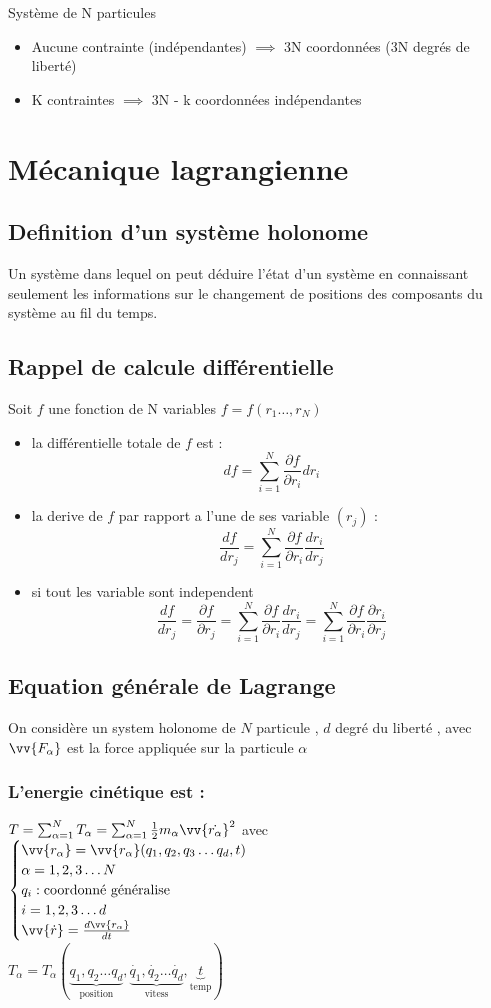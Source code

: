 \documentclass[12pt,oneside]{book}
\begin{document}
Système de N particules
\begin{itemize}
    \item Aucune contrainte (indépendantes) $\implies$ 3N coordonnées (3N degrés de liberté)
    \item K contraintes $\implies$ 3N - k coordonnées indépendantes
\end{itemize}
\chapter{Mécanique lagrangienne}
\section{Definition d'un système holonome }
Un système dans lequel on peut déduire l'état d'un système en connaissant seulement les informations sur le changement de positions des composants du système au fil du temps.
\section{Rappel de calcule différentielle}
Soit $f$ une fonction de N variables $f=f(r_1 \ldots , r_N)$
\begin{itemize}
	\item la différentielle totale de $f$ est :
		\[df = \sum^N_{i=1}\frac{\partial f}{\partial r_i}dr_i\]
	\item la derive de $f$ par rapport a l'une de ses variable $(r_j)$ :
	      \[ \frac{df}{dr_j} = \sum^N_{i=1}\frac{\partial f}{\partial r_i}\frac{dr_i}{dr_j} \]
	\item si tout les variable sont independent
	      \[ \frac{df}{dr_j} = \frac{\partial f}{\partial r_j} = \sum^N_{i=1}\frac{\partial f}{\partial r_i}\frac{dr_i}{dr_j} = \sum^N_{i=1}\frac{\partial f}{\partial r_i}\frac{\partial r_i}{\partial r_j} \]
\end{itemize}
\pagebreak
\section{Equation générale de Lagrange }
On considère un system holonome de $N$ particule , $d$ degré du liberté , avec $\vv{F_\alpha}$ est la force appliquée sur la particule $\alpha$
\subsection{L'energie cinétique est :}
$T = \sum^N_{\alpha=1}T_\alpha =\sum^N_{\alpha=1}\frac{1}{2}m_\alpha\vv{\dot{r_\alpha}}^2 $ avec $\begin{cases}
	\vv{r_\alpha} = \vv{r_\alpha}(q_1,q_2,q_3\ldots q_d ,t)\\
	\alpha = 1,2,3 \ldots N\\
	q_i : \text{coordonné généralise} \\
	i=1,2,3\ldots d\\
	\vv{\dot{r}} = \frac{d\vv{r_\alpha} }{dt}
\end{cases}$\\
$T_\alpha = T_\alpha(\underbrace{q_1,q_2\ldots q_d}_{\text{position}} , \underbrace{\dot{q_1},\dot{q_2}\ldots\dot{q_d}}_{\text{vitess}} , \underbrace{t}_{\text{temp}}) $ \\
\end{document}
